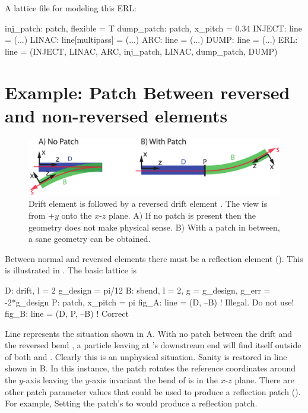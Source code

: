  A lattice file for modeling this ERL:
\begin{example}
  inj_patch: patch, flexible = T
  dump_patch: patch, x_pitch = 0.34
  INJECT: line = (...)
  LINAC: line[multipass] = (...)
  ARC: line = (...)
  DUMP: line = (...)
  ERL: line = (INJECT, LINAC, ARC, inj_patch, LINAC, dump_patch, DUMP)
\end{example}



\section{Example: Patch Between reversed and non-reversed elements}
\label{s:ex.patch}

\begin{figure}[tb]
  \centering
  \includegraphics[width=5in]{patch-between.pdf}
  \caption[Patching between reversed and non-reversed elements.]{
Drift element  is followed by a reversed drift element .
The view is from $+y$ onto the $x$-$z$ plane. A) If no patch is
present then the geometry does not make physical sense. B) With a
patch in between, a sane geometry can be obtained.}
  \label{f:patch.between}
\end{figure}

Between normal and reversed elements there must be a reflection
 element ().  This is illustrated in
. The basic lattice is
\begin{example}
  D: drift, l = 2
  g_design = pi/12
  B: sbend, l = 2, g = g_design, g_err = -2*g_design
  P: patch, x_pitch = pi
  fig_A: line = (D, --B)     ! Illegal. Do not use!
  fig_B: line = (D, P, --B)  ! Correct
\end{example}
Line  represents the situation shown in
A.  With no patch between the drift  and
the reversed bend , a particle leaving  at 's
downstream end will find itself outside of both  and
. Clearly this is an unphysical situation. Sanity is restored in
line  shown in B. In this instance, the
patch  rotates the reference coordinates around the $y$-axis
leaving the $y$-axis invariant the bend of  is in the $x$-$z$
plane. There are other patch parameter values that could be used to
produce a reflection patch ().  For example,
Setting the patch's  to  would produce a reflection
patch.

